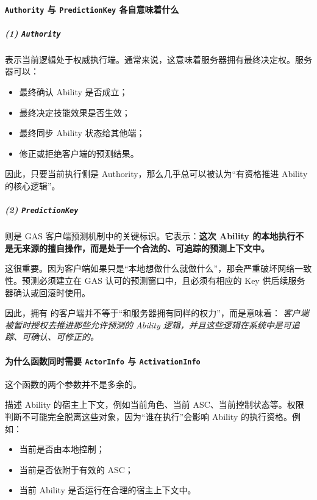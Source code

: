 \paragraph{\texttt{Authority} 与 \texttt{PredictionKey} 各自意味着什么}

\subparagraph{(1) \texttt{Authority}}

 表示当前逻辑处于权威执行端。通常来说，这意味着服务器拥有最终决定权。服务器可以：

\begin{itemize}
	\item 最终确认 Ability 是否成立；
	\item 最终决定技能效果是否生效；
	\item 最终同步 Ability 状态给其他端；
	\item 修正或拒绝客户端的预测结果。
\end{itemize}

因此，只要当前执行侧是 Authority，那么几乎总可以被认为“有资格推进 Ability 的核心逻辑”。

\subparagraph{(2) \texttt{PredictionKey}}

 则是 GAS 客户端预测机制中的关键标识。它表示：\textbf{这次 Ability 的本地执行不是无来源的擅自操作，而是处于一个合法的、可追踪的预测上下文中。}

这很重要。因为客户端如果只是“本地想做什么就做什么”，那会严重破坏网络一致性。预测必须建立在 GAS 认可的预测窗口中，且必须有相应的 Key 供后续服务器确认或回滚时使用。

因此，拥有  的客户端并不等于“和服务器拥有同样的权力”，而是意味着：
\emph{客户端被暂时授权去推进那些允许预测的 Ability 逻辑，并且这些逻辑在系统中是可追踪、可确认、可修正的。}

\paragraph{为什么函数同时需要 \texttt{ActorInfo} 与 \texttt{ActivationInfo}}

这个函数的两个参数并不是多余的。

 描述 Ability 的宿主上下文，例如当前角色、当前 ASC、当前控制状态等。权限判断不可能完全脱离这些对象，因为“谁在执行”会影响 Ability 的执行资格。例如：

\begin{itemize}
	\item 当前是否由本地控制；
	\item 当前是否依附于有效的 ASC；
	\item 当前 Ability 是否运行在合理的宿主上下文中。
\end{itemize}

